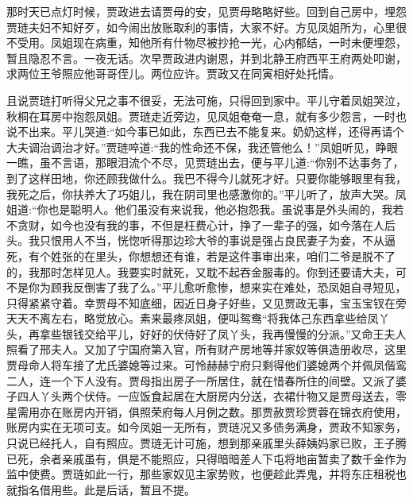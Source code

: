 \begin{parag}
    那时天已点灯时候，贾政进去请贾母的安，见贾母略略好些。回到自己房中，埋怨贾琏夫妇不知好歹，如今闹出放账取利的事情，大家不好。方见凤姐所为，心里很不受用。凤姐现在病重，知他所有什物尽被抄抢一光，心内郁结，一时未便埋怨，暂且隐忍不言。一夜无话。次早贾政进内谢恩，并到北静王府西平王府两处叩谢，求两位王爷照应他哥哥侄儿。两位应许。贾政又在同寅相好处托情。
\end{parag}


\begin{parag}
    且说贾琏打听得父兄之事不很妥，无法可施，只得回到家中。平儿守着凤姐哭泣，秋桐在耳房中抱怨凤姐。贾琏走近旁边，见凤姐奄奄一息，就有多少怨言，一时也说不出来。平儿哭道:“如今事已如此，东西已去不能复来。奶奶这样，还得再请个大夫调治调治才好。”贾琏啐道:“我的性命还不保，我还管他么！”凤姐听见，睁眼一瞧，虽不言语，那眼泪流个不尽，见贾琏出去，便与平儿道:“你别不达事务了，到了这样田地，你还顾我做什么。我巴不得今儿就死才好。只要你能够眼里有我，我死之后，你扶养大了巧姐儿，我在阴司里也感激你的。”平儿听了，放声大哭。凤姐道:“你也是聪明人。他们虽没有来说我，他必抱怨我。虽说事是外头闹的，我若不贪财，如今也没有我的事，不但是枉费心计，挣了一辈子的强，如今落在人后头。我只恨用人不当，恍惚听得那边珍大爷的事说是强占良民妻子为妾，不从逼死，有个姓张的在里头，你想想还有谁，若是这件事审出来，咱们二爷是脱不了的，我那时怎样见人。我要实时就死，又耽不起吞金服毒的。你到还要请大夫，可不是你为顾我反倒害了我了么。”平儿愈听愈惨，想来实在难处，恐凤姐自寻短见，只得紧紧守着。幸贾母不知底细，因近日身子好些，又见贾政无事，宝玉宝钗在旁天天不离左右，略觉放心。素来最疼凤姐，便叫鸳鸯“将我体己东西拿些给凤丫头，再拿些银钱交给平儿，好好的伏侍好了凤丫头，我再慢慢的分派。”又命王夫人照看了邢夫人。又加了宁国府第入官，所有财产房地等并家奴等俱造册收尽，这里贾母命人将车接了尤氏婆媳等过来。可怜赫赫宁府只剩得他们婆媳两个并佩凤偕鸾二人，连一个下人没有。贾母指出房子一所居住，就在惜春所住的间壁。又派了婆子四人丫头两个伏侍。一应饭食起居在大厨房内分送，衣裙什物又是贾母送去，零星需用亦在账房内开销，俱照荣府每人月例之数。那贾赦贾珍贾蓉在锦衣府使用，账房内实在无项可支。如今凤姐一无所有，贾琏况又多债务满身，贾政不知家务，只说已经托人，自有照应。贾琏无计可施，想到那亲戚里头薛姨妈家已败，王子腾已死，余者亲戚虽有，俱是不能照应，只得暗暗差人下屯将地亩暂卖了数千金作为监中使费。贾琏如此一行，那些家奴见主家势败，也便趁此弄鬼，并将东庄租税也就指名借用些。此是后话，暂且不提。
\end{parag}


